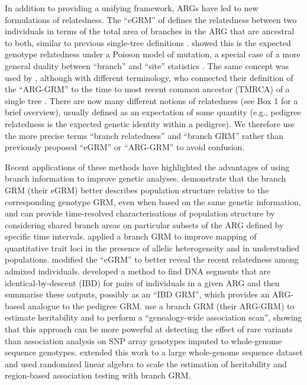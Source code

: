 In addition to providing a unifying framework,
ARGs have led to new formulations of relatedness.
%
The ``eGRM'' of \citet{fan2022genealogical}
defines the relatedness between two individuals
in terms of the total area of branches in the ARG that are ancestral to both,
similar to previous single-tree definitions \citep{slatkin1991inbreeding}.
%
\citet{fan2022genealogical} showed this is the expected genotype relatedness
under a Poisson model of mutation,
a special case of a more general duality between ``branch''
and ``site'' statistics \citep{ralph2019empirical, ralph2020efficiently}.
%
The same concept was used by \citet{zhang2023biobank},
although with different terminology,
who connected their definition of the ``ARG-GRM'' to
the time to most recent common ancestor (TMRCA)
of a single tree \citep{slatkin1991inbreeding, mcvean2009genealogical}.
%
There are now many different notions of relatedness (see Box 1 for a 
brief overview), usually defined as an expectation of some 
quantity (e.g., pedigree relatedness is the expected genetic identity within a pedigree).
We therefore use the more precise terms 
``branch relatedness'' and ``branch GRM'' 
rather than previously proposed ``eGRM'' or ``ARG-GRM'' 
to avoid confusion.

Recent applications of these methods have highlighted the advantages of
using branch information to improve genetic analyses.
%
\citet{fan2022genealogical} demonstrate that the branch GRM (their eGRM)
better describes population structure relative to the corresponding genotype GRM,
even when based on the same genetic information,
and can provide time-resolved characterisations of population structure
by considering shared branch areas on particular subsets of the ARG
defined by specific time intervals.
%
\citet{link2023tree} applied a branch GRM to improve mapping of  quantitative trait loci
in the presence of allelic heterogeneity and in understudied populations.
%
\citet{Tang2025Genealogy} modified the ``eGRM'' to better reveal the recent relatedness
among admixed individuals.
%
\citet{tsambos2022efficient} developed a method
to find DNA segments that are identical-by-descent (IBD) for pairs of individuals in a given ARG and
then summarise these outputs, possibly as an ``IBD GRM'',
which provides an ARG-based analogue to the pedigree GRM.
%
\citet{zhang2023biobank} use a branch GRM (their ARG-GRM)
to estimate heritability and to perform a ``genealogy-wide association scan'',
showing that this approach can be more powerful at detecting the effect of rare variants
than association analysis on SNP array genotypes imputed to whole-genome sequence genotypes.
%
\citet{gunnarsson2024scalable} extended this work to a large whole-genome sequence dataset
and \citet{zhu2024variance} used randomized linear algebra to
scale the estimation of heritability and region-based association testing with branch GRM.

